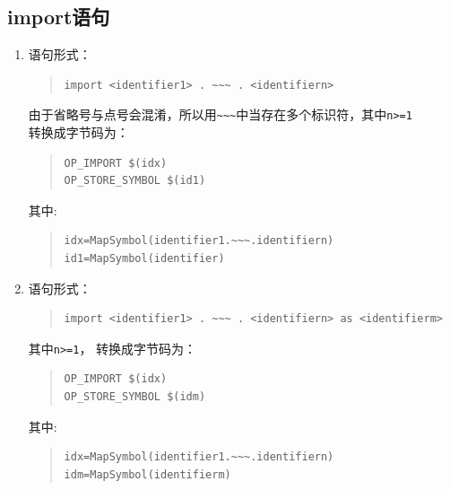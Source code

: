 \subsection{import语句}
\begin{enumerate}
\item 语句形式：
\begin{quote}
\begin{verbatim}
import <identifier1> . ~~~ . <identifiern>
\end{verbatim}
\end{quote}
由于省略号与点号会混淆，所以用\verb|~~~|中当存在多个标识符，其中\verb|n>=1| \\
转换成字节码为：
\begin{quote}
\begin{verbatim}
OP_IMPORT $(idx)
OP_STORE_SYMBOL $(id1)
\end{verbatim}
\end{quote}
其中:
\begin{quote}
\begin{verbatim}
idx=MapSymbol(identifier1.~~~.identifiern)
id1=MapSymbol(identifier)
\end{verbatim}
\end{quote}

\item 语句形式：
\begin{quote}
\begin{verbatim}
import <identifier1> . ~~~ . <identifiern> as <identifierm>
\end{verbatim}
\end{quote}
其中\verb|n>=1|， 转换成字节码为：
\begin{quote}
\begin{verbatim}
OP_IMPORT $(idx)
OP_STORE_SYMBOL $(idm)
\end{verbatim}
\end{quote}
其中:
\begin{quote}
\begin{verbatim}
idx=MapSymbol(identifier1.~~~.identifiern)
idm=MapSymbol(identifierm)
\end{verbatim}
\end{quote}
\end{enumerate}

